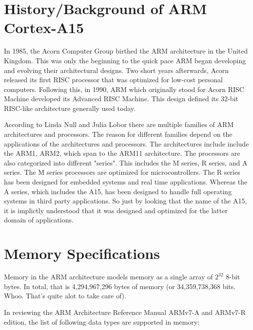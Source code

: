 \documentclass[12pt]{scrreprt}
\begin{document}
\tableofcontents

\chapter{History/Background of ARM Cortex-A15}

	In 1985, the Acorn Computer Group birthed the ARM architecture in the United Kingdom. This was only the beginning to
	the quick pace ARM began developing and evolving their architectural designs. Two short years afterwards, Acorn 
	released its first RISC processor that was optimized for low-cost personal computers. Following this, in 1990, ARM 
	which originally stood for Acorn RISC Machine developed its Advanced RISC Machine. This design defined its 32-bit RISC-like
	architecture generally used today.

	According to Linda Null and Julia Lobor there are multiple families of ARM architectures and processors. The reason for different
	families depend on the applications of the architectures and processors. The architectures include include the ARM1, ARM2,
	which span to the ARM11 architecture. The processors are also categorized into different "series". This includes the
	M series, R series, and A series. The M series processors are optimized for microcontrollers. The R series has been designed
	for embedded systems and real time applications. Whereas the A series, which includes the A15, has been designed to handle
	full operating systems in third party applications. So just by looking that the name of the A15, it is implictly understood
	that it was designed and optimized for the latter domain of applications.

{\let\clearpage\relax\chapter{Memory Specifications}}

	Memory in the ARM architecture models memory as a single array of $2^{32}$ 8-bit bytes.
	In total, that is 4,294,967,296 bytes of memory (or 34,359,738,368 bits. Whoo. That's quite alot to take care of).

	In reviewing the ARM Architecture Reference Manual ARMv7-A and ARMv7-R edition, the list of following data types are supported in memory:
\end{document}
